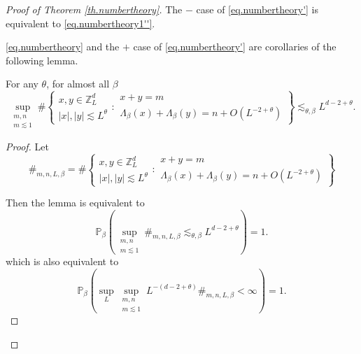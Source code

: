 


\begin{proof}[Proof of Theorem \ref{th.numbertheory}]
The $-$ case of \eqref{eq.numbertheory'} is equivalent to \eqref{eq.numbertheory1''}.

\eqref{eq.numbertheory} and the $+$ case of \eqref{eq.numbertheory'} are corollaries of the following lemma. 

\begin{lem}\label{lem.irrationallemma} For any $\theta$, for almost all $\beta$
\begin{equation}
    \sup_{\substack{m,n\\m\lesssim 1}} \#\left\{\begin{array}{cc}
         x,y\in\mathbb{Z}^d_L  \\
         |x|,|y|\lesssim L^{\theta}
    \end{array}:\begin{array}{cc}
         x+y=m  \\
         \Lambda_{\beta}(x)+\Lambda_{\beta}(y)=n+O(L^{-2+\theta})
    \end{array}\right\}\lesssim_{\theta,\beta} L^{d-2+\theta} .
\end{equation}
\end{lem}
\begin{proof} Let 
\begin{equation}
    \#_{m,n,L,\beta}=\#\left\{\begin{array}{cc}
         x,y\in\mathbb{Z}^d_L  \\
         |x|,|y|\lesssim L^{\theta}
    \end{array}:\begin{array}{cc}
         x+y=m  \\
         \Lambda_{\beta}(x)+\Lambda_{\beta}(y)=n+O(L^{-2+\theta})
    \end{array}\right\}
\end{equation}


Then the lemma is equivalent to 
\begin{equation}
    \mathbb{P}_{\beta}\left(\sup_{\substack{m,n\\m\lesssim 1}} \#_{m,n,L,\beta} \lesssim_{\theta,\beta} L^{d-2+\theta}\right)=1.
\end{equation}
which is also equivalent to
\begin{equation}\label{eq.irrationallemmaexpand}
    \mathbb{P}_{\beta}\left(\sup_{L}\sup_{\substack{m,n\\m\lesssim 1}} L^{-(d-2+\theta)}\#_{m,n,L,\beta} <\infty \right)=1.
\end{equation}


\end{proof}
\end{proof}
